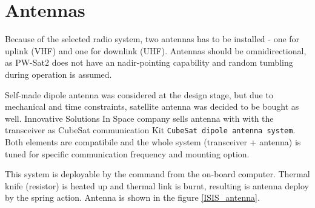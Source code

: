 \section{Antennas}
Because of the selected radio system, two antennas has to be installed - one for uplink (VHF) and one for downlink (UHF). Antennas should be omnidirectional, as PW-Sat2 does not have an nadir-pointing capability and random tumbling during operation is assumed.

Self-made dipole antenna was considered at the design stage, but due to mechanical and time constraints, satellite antenna was decided to be bought as well. Innovative Solutions In Space company sells antenna with with the transceiver as CubeSat communication Kit \texttt{CubeSat dipole antenna system}. Both elements are compatibile and the whole system (transceiver + antenna) is tuned for specific communication frequency and mounting option.

This system is deployable by the command from the on-board computer. Thermal knife (resistor) is heated up and thermal link is burnt, resulting is antenna deploy by the spring action. Antenna is shown in the figure \ref{ISIS_antenna}.

